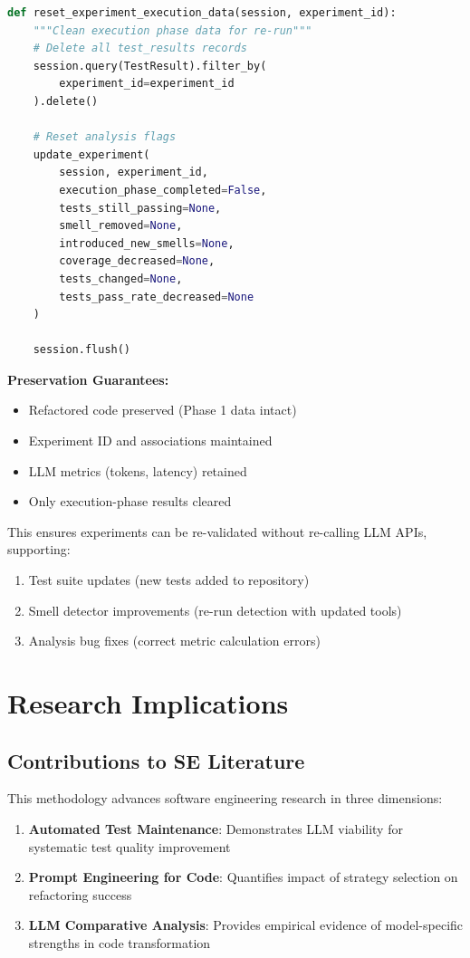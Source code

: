 \begin{lstlisting}[language=Python, caption=Experiment Reset]
def reset_experiment_execution_data(session, experiment_id):
    """Clean execution phase data for re-run"""
    # Delete all test_results records
    session.query(TestResult).filter_by(
        experiment_id=experiment_id
    ).delete()
    
    # Reset analysis flags
    update_experiment(
        session, experiment_id,
        execution_phase_completed=False,
        tests_still_passing=None,
        smell_removed=None,
        introduced_new_smells=None,
        coverage_decreased=None,
        tests_changed=None,
        tests_pass_rate_decreased=None
    )
    
    session.flush()
\end{lstlisting}

\textbf{Preservation Guarantees:}
\begin{itemize}
    \item Refactored code preserved (Phase 1 data intact)
    \item Experiment ID and associations maintained
    \item LLM metrics (tokens, latency) retained
    \item Only execution-phase results cleared
\end{itemize}

This ensures experiments can be re-validated without re-calling LLM APIs, supporting:
\begin{enumerate}
    \item Test suite updates (new tests added to repository)
    \item Smell detector improvements (re-run detection with updated tools)
    \item Analysis bug fixes (correct metric calculation errors)
\end{enumerate}

\section{Research Implications}

\subsection{Contributions to SE Literature}

This methodology advances software engineering research in three dimensions:

\begin{enumerate}
    \item \textbf{Automated Test Maintenance}: Demonstrates LLM viability for systematic test quality improvement
    \item \textbf{Prompt Engineering for Code}: Quantifies impact of strategy selection on refactoring success
    \item \textbf{LLM Comparative Analysis}: Provides empirical evidence of model-specific strengths in code transformation
\end{enumerate}


